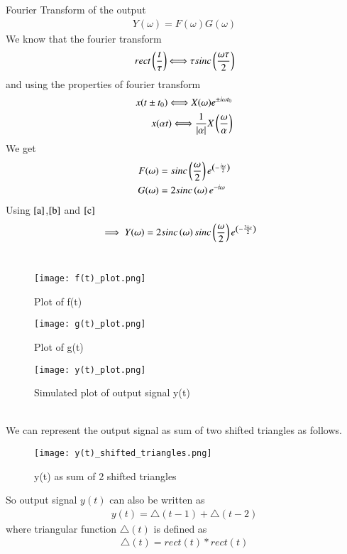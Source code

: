 \documentclass[journal,12pt,twocolumn]{IEEEtran}
\begin{document}
Fourier Transform of the output
\begin{align}
    Y(\omega)=F(\omega)G(\omega)  \label{a}
\end{align}
We know that the fourier transform
\begin{align}
    rect\left(\frac{t}{\tau}\right)\Longleftrightarrow \tau sinc\left(\frac{\omega \tau}{2}\right)
\end{align}
and using the properties of fourier transform
\begin{align}
    x(t\pm t_0)\Longleftrightarrow X(\omega)e^{\pm i\omega t_0}\\
    x(\alpha t)\Longleftrightarrow \frac{1}{|\alpha|}X\left(\frac{\omega}{\alpha}\right)
\end{align}
We get
\begin{align}
    F(\omega) &= sinc\left(\frac{\omega}{2}\right)e^{\left(- \frac{i\omega}{2}\right)} \label{b}\\ 
    G(\omega) &= 2sinc\left(\omega\right)e^{-i\omega} \label{c}
\end{align}
Using $\eqref{a}$,$\eqref{b}$ and $\eqref{c}$
\begin{align}
    \implies Y(\omega) &= 2sinc\left(\omega\right)sinc\left(\frac{\omega}{2}\right)e^{\left(- \frac{3i\omega}{2}\right)}
\end{align}\\
\begin{figure}[!ht]
    \centering
    \texttt{[image: f(t)\_plot.png]}
    \caption{Plot of f(t)}
    \label{plot}
\end{figure}
\begin{figure}[!ht]
    \centering
    \texttt{[image: g(t)\_plot.png]}
    \caption{Plot of g(t)}
    \label{plot}
\end{figure}
\begin{figure}[!ht]
    \centering
    \texttt{[image: y(t)\_plot.png]}
    \caption{Simulated plot of output signal y(t)}
    \label{plot}
\end{figure}\\
We can represent the output signal as sum of two shifted triangles as follows.
\begin{figure}[!ht]
    \centering
    \texttt{[image: y(t)\_shifted\_triangles.png]}
    \caption{y(t) as sum of 2 shifted triangles}
    \label{plot}
\end{figure}
So output signal $y(t)$ can also be written as
\begin{align}
    y(t) = \triangle(t-1)+\triangle(t-2)
\end{align}
where triangular function $\triangle(t)$ is defined as
\begin{align}
    \triangle(t) = rect(t)*rect(t)
\end{align}
\end{document}
